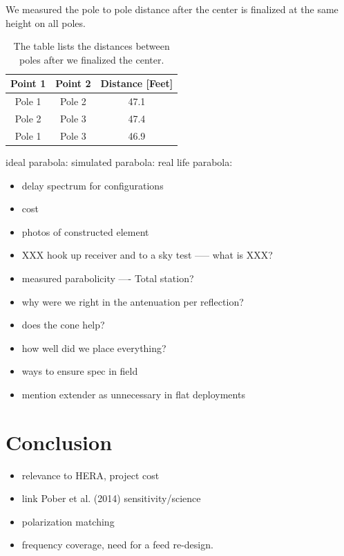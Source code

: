 \documentclass[preprint]{aastex}  %
\begin{document}
We measured the pole to pole distance after the center is finalized at the same height on all poles.

\begin{table}[!h]
\centering
\begin{tabular}{|c|c|c|} \hline

Point 1 & Point 2 & Distance [Feet] \\ \hline
Pole 1 & Pole 2 & 47.1 \\ \hline
Pole 2 & Pole 3 & 47.4 \\ \hline
Pole 1 & Pole 3 & 46.9 \\ \hline


\end{tabular}
\caption{The table lists the distances between poles after we finalized the center. \label{Tab:dist_p2p}}
\end{table}


ideal parabola: 
simulated parabola:
real life parabola:


 

\begin{itemize}
\item delay spectrum for configurations
\item cost
\item photos of constructed element
\item XXX hook up receiver and to a sky test ----- what is XXX?
\item measured parabolicity ---- Total station?
\item why were we right in the antenuation per reflection?
\item does the cone help?
\item how well did we place everything?
\item ways to ensure spec in field
\item mention extender as unnecessary in flat deployments
\end{itemize}

\section{Conclusion}
\label{sec:conclusion}

\begin{itemize}
\item relevance to HERA, project cost
\item link Pober et al. (2014) sensitivity/science
\item polarization matching
\item frequency coverage, need for a feed re-design.
\end{itemize}
\end{document}
